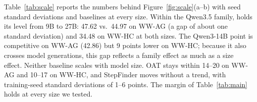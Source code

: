 Table~\ref{tab:scale} reports the numbers behind Figure~\ref{fig:scale}(a--b) with seed standard deviations and baselines at every size. Within the Qwen3.5 family, \soap{} holds its level from 9B to 27B: 47.62 vs.\ 44.97 on \textsc{WW-AG} (a gap of about one standard deviation) and 34.48 on \textsc{WW-HC} at both sizes. The Qwen3-14B point is competitive on \textsc{WW-AG} (42.86) but 9 points lower on \textsc{WW-HC}; because it also crosses model generations, this gap reflects a family effect as much as a size effect. Neither baseline scales with model size. OAT stays within 14--20 on \textsc{WW-AG} and 10--17 on \textsc{WW-HC}, and StepFinder moves without a trend, with training-seed standard deviations of 1--6 points. The margin of Table~\ref{tab:main} holds at every size we tested.

